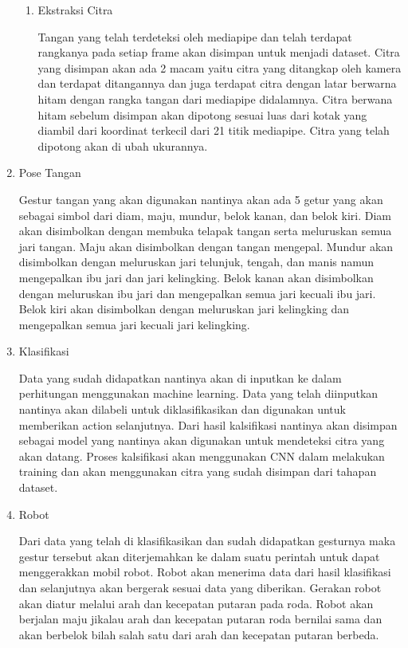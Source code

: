\begin{enumerate}
\begin{enumerate}
  \item Ekstraksi Citra \par
  Tangan yang telah terdeteksi oleh mediapipe dan telah terdapat rangkanya pada setiap frame akan disimpan untuk menjadi dataset. Citra yang disimpan akan ada 2 macam yaitu citra yang ditangkap oleh kamera dan terdapat ditangannya dan juga terdapat citra dengan latar berwarna hitam dengan rangka tangan dari mediapipe didalamnya. Citra berwana hitam sebelum disimpan akan dipotong sesuai luas dari kotak yang diambil dari koordinat terkecil dari 21 titik mediapipe. Citra yang telah dipotong akan di ubah ukurannya.
\end{enumerate}

  \item Pose Tangan \par
  Gestur tangan yang akan digunakan nantinya akan ada 5 getur yang akan sebagai simbol dari diam, maju, mundur, belok kanan, dan belok kiri. Diam akan disimbolkan dengan membuka telapak tangan serta meluruskan semua jari tangan. Maju akan disimbolkan dengan tangan mengepal. Mundur akan disimbolkan dengan meluruskan jari telunjuk, tengah, dan manis namun mengepalkan ibu jari dan jari kelingking. Belok kanan akan disimbolkan dengan meluruskan ibu jari dan mengepalkan semua jari kecuali ibu jari. Belok kiri akan disimbolkan dengan meluruskan jari kelingking dan mengepalkan semua jari kecuali jari kelingking.
  
  \item Klasifikasi \par
  Data yang sudah didapatkan nantinya akan di inputkan ke dalam perhitungan menggunakan machine learning. Data yang telah diinputkan nantinya akan dilabeli untuk diklasifikasikan dan digunakan untuk memberikan action selanjutnya. Dari hasil kalsifikasi nantinya akan disimpan sebagai model yang nantinya akan digunakan untuk mendeteksi citra yang akan datang. Proses kalsifikasi akan menggunakan CNN dalam melakukan training dan akan menggunakan citra yang sudah disimpan dari tahapan dataset. 
  
  \item Robot \par
  Dari data yang telah di klasifikasikan dan sudah didapatkan gesturnya maka gestur tersebut akan diterjemahkan ke dalam suatu perintah untuk dapat menggerakkan mobil robot. Robot akan menerima data dari hasil klasifikasi dan selanjutnya akan bergerak sesuai data yang diberikan. Gerakan robot akan diatur melalui arah dan kecepatan putaran pada roda. Robot akan berjalan maju jikalau arah dan kecepatan putaran roda bernilai sama dan akan berbelok bilah salah satu dari arah dan kecepatan putaran berbeda.
\end{enumerate}

